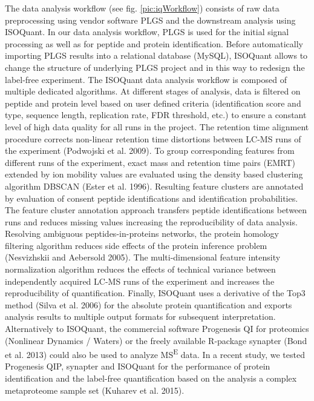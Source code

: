 \documentclass[]{article}
\begin{document}
The data analysis workflow (see fig. \ref{pic:iqWorkflow}) consists of
raw data preprocessing using vendor software PLGS and the downstream
analysis using ISOQuant. In our data analysis workflow, PLGS is used for
the initial signal processing as well as for peptide and protein
identification. Before automatically importing PLGS results into a
relational database (MySQL), ISOQuant allows to change the structure of
underlying PLGS project and in this way to redesign the label-free
experiment. The ISOQuant data analysis workflow is composed of multiple
dedicated algorithms. At different stages of analysis, data is filtered
on peptide and protein level based on user defined criteria
(identification score and type, sequence length, replication rate, FDR
threshold, etc.) to ensure a constant level of high data quality for all
runs in the project. The retention time alignment procedure corrects
non-linear retention time distortions between LC-MS runs of the
experiment (Podwojski et al. 2009). To group corresponding features from
different runs of the experiment, exact mass and retention time pairs
(EMRT) extended by ion mobility values are evaluated using the density
based clustering algorithm DBSCAN (Ester et al. 1996). Resulting feature
clusters are annotated by evaluation of consent peptide identifications
and identification probabilities. The feature cluster annotation
approach transfers peptide identifications between runs and reduces
missing values increasing the reproducibility of data analysis.
Resolving ambiguous peptides-in-proteins networks, the protein homology
filtering algorithm reduces side effects of the protein inference
problem (Nesvizhskii and Aebersold 2005). The multi-dimensional feature
intensity normalization algorithm reduces the effects of technical
variance between independently acquired LC-MS runs of the experiment and
increases the reproducibility of quantification. Finally, ISOQuant uses
a derivative of the Top3 method (Silva et al. 2006) for the absolute
protein quantification and exports analysis results to multiple output
formats for subsequent interpretation. Alternatively to ISOQuant, the
commercial software Progenesis QI for proteomics (Nonlinear Dynamics /
Waters) or the freely available R-package synapter (Bond et al. 2013)
could also be used to analyze MS\textsuperscript{E} data. In a recent
study, we tested Progenesis QIP, synapter and ISOQuant for the
performance of protein identification and the label-free quantification
based on the analysis a complex metaproteome sample set (Kuharev et al.
2015).
\end{document}

